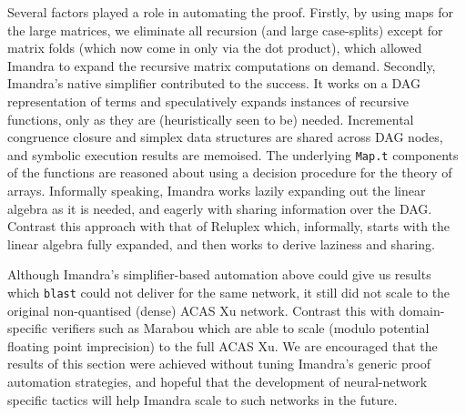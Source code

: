 \documentclass[runningheads]{llncs}
\newcommand{\knote}[1]{\todo[inline, color=blue!20]{#1}}
\begin{document}
Several factors played a role in automating the proof.
Firstly, by using maps for the
large matrices, we eliminate all recursion (and large case-splits) except for
matrix folds (which now come in only via the dot product), which allowed Imandra
to expand the recursive matrix computations on demand.
Secondly, Imandra's native simplifier contributed to the success. It works on a
DAG representation of terms and speculatively expands instances of recursive
functions, only as they are (heuristically seen to be) needed. Incremental
congruence closure and simplex data structures are shared across DAG nodes, and
symbolic execution results are memoised. The underlying \lstinline{Map.t}
components of the functions are reasoned about using a decision procedure for
the theory of arrays.
Informally speaking, Imandra works lazily expanding out the linear algebra as it is needed, and eagerly with sharing information over the DAG.
Contrast this approach with that of Reluplex which, informally, starts with the linear algebra fully expanded, and then works to derive laziness and sharing. 


Although Imandra's simplifier-based automation above could give us results which
\lstinline{blast} could not deliver for the same network, it still did not scale
to the original non-quantised (dense) ACAS Xu network. Contrast this with
domain-specific verifiers such as Marabou which are able to scale (modulo
potential floating point imprecision) to the full ACAS Xu.
We are encouraged that the results of
this section were achieved without tuning Imandra's generic proof automation
strategies, and hopeful that the development of neural-network specific tactics %
will help Imandra
scale to such networks in the future.  
\end{document}
